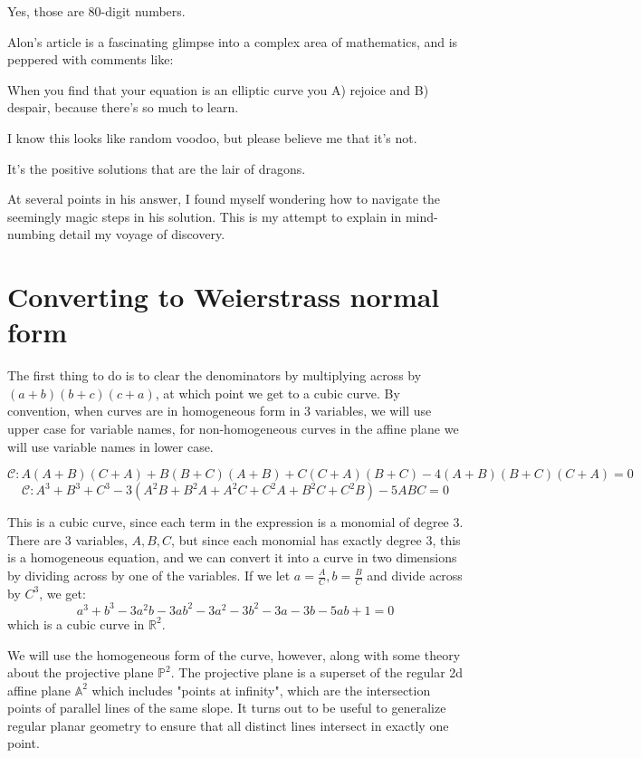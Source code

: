 \documentclass{article}
\begin{document}
Yes, those are 80-digit numbers.

Alon's article is a fascinating glimpse into a complex area of mathematics, and is peppered with comments like:
\begin{displayquote}
	When you find that your equation is an elliptic curve you A) rejoice and B) despair, because there’s
	so much to learn.
\end{displayquote}
\begin{displayquote}
	I know this looks like random voodoo, but please believe me that it’s not.
\end{displayquote}
\begin{displayquote}
	It’s the positive solutions that are the lair of dragons.
\end{displayquote}

At several points in his answer, I found myself wondering how to navigate the seemingly magic steps in his
solution. This is my attempt to explain in mind-numbing detail my voyage of discovery.

\section{Converting to Weierstrass normal form}

The first thing to do is to clear the denominators by multiplying across by $(a+b)(b+c)(c+a)$, at which point
we get to a cubic curve. By convention, when curves are in homogeneous form in 3 variables, we will use upper
case for variable names, for non-homogeneous curves in the affine plane we will use variable names in lower case.

\[ \mathcal{C}: A(A+B)(C+A) + B(B+C)(A+B) + C(C+A)(B+C) - 4(A+B)(B+C)(C+A) = 0 \]
\[ \mathcal{C}: A^3 + B^3 + C^3 -3(A^2B+B^2A+A^2C+C^2A+B^2C+C^2B) - 5ABC = 0 \]

This is a cubic curve, since each term in the expression is a monomial of degree 3. There are 3 variables,
$A, B, C$, but since each monomial has exactly degree 3, this is a homogeneous equation, and we can convert it
into a curve in two dimensions by dividing across by one of the variables. If we let
$a = \frac{A}{C}, b = \frac{B}{C}$ and divide across by $C^3$, we get:
\[ a^3 + b^3 -3a^2b -3 ab^2 -3a^2 -3b^2 -3a -3b -5ab +1 = 0 \]
which is a cubic curve in $\mathbb{R}^2$.

We will use the homogeneous form of the curve, however, along with some theory about the projective plane
$\mathbb{P}^2$. The projective plane is a superset of the regular 2d affine plane $\mathbb{A}^2$ which includes
"points at infinity", which are the intersection points of parallel lines of the same slope. It turns out to be
useful to generalize regular planar geometry to ensure that all distinct lines intersect in exactly one point.
\end{document}
